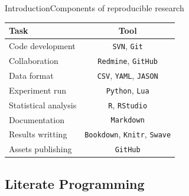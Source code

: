 \documentclass{beamer}
\begin{document}
\begin{frame}{Introduction}{Components of reproducible research}
	\begin{table}
	\centering
	\begin{tabular}{|l|c|}\hline
	\textbf{Task}   & \textbf{Tool} \\ \hline
	Code development& \texttt{SVN}, \texttt{Git}  \\ \hline
	Collaboration   & \texttt{Redmine}, \texttt{GitHub}  \\ \hline
    Data format     & \texttt{CSV}, \texttt{YAML}, \texttt{JASON} \\ \hline
    Experiment run  & \texttt{Python}, \texttt{Lua}   \\ \hline
    Statistical analysis  & \texttt{R}, \texttt{RStudio}   \\ \hline
	Documentation & \texttt{Markdown}   \\ \hline
	Results writting	  & \texttt{Bookdown}, \texttt{Knitr}, \texttt{Swave} \\ \hline
	Assets publishing & \texttt{GitHub}\\ \hline
	\end{tabular}
	\end{table}
\end{frame}




\subsection[Literate Programming]{Literate Programming}
\end{document}
